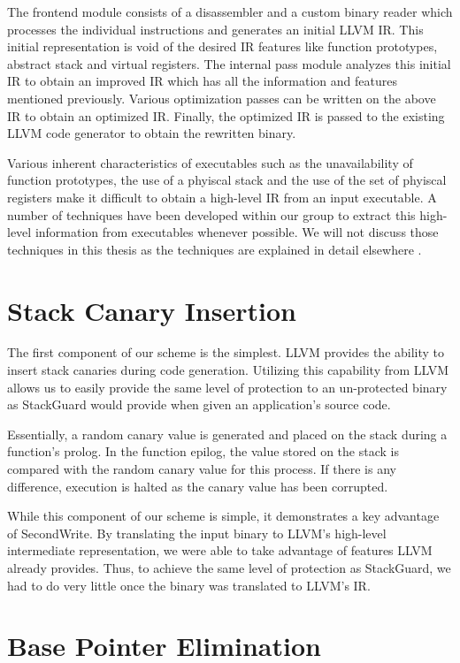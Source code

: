 The frontend module consists of a disassembler and a custom binary reader which processes the
individual instructions and generates an initial LLVM IR. This initial representation is void of the
desired IR features like function prototypes, abstract stack and virtual registers. The internal
pass module analyzes this initial IR to obtain an improved IR which has all the information and
features mentioned previously. Various optimization passes can be written on the above IR to obtain
an optimized IR. Finally, the optimized IR is passed to the existing LLVM code generator to obtain
the rewritten binary.

Various inherent characteristics of executables such as the unavailability of function prototypes,
the use of a phyiscal stack and the use of the set of phyiscal registers make it difficult to obtain
a high-level IR from an input executable. A number of techniques have been developed within our
group to extract this high-level information from executables whenever possible. We will not discuss
those techniques in this thesis as the techniques are explained in detail elsewhere \cite{}.

\section{Stack Canary Insertion}

The first component of our scheme is the simplest. LLVM provides the ability to insert stack
canaries during code generation. Utilizing this capability from LLVM allows us to easily provide the
same level of protection to an un-protected binary as StackGuard would provide when given an
application's source code.

Essentially, a random canary value is generated and placed on the stack during a function's prolog.
In the function epilog, the value stored on the stack is compared with the random canary value for
this process. If there is any difference, execution is halted as the canary value has been
corrupted.

While this component of our scheme is simple, it demonstrates a key advantage of SecondWrite. By
translating the input binary to LLVM's high-level intermediate representation, we were able to take
advantage of features LLVM already provides. Thus, to achieve the same level of protection as
StackGuard, we had to do very little once the binary was translated to LLVM's IR.

\section{Base Pointer Elimination}

